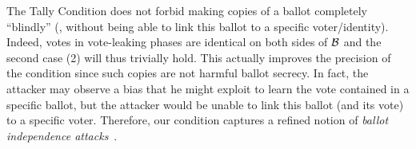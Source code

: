   The Tally Condition does not forbid making
  copies of a ballot completely ``blindly''
  (\ie, without being able to link this ballot to a specific
  voter\slash identity).
  Indeed, votes in vote-leaking phases are identical
  on both sides of $\mathcal{B}$ and the second case (2) will
  thus trivially hold.
  This actually improves the precision of the condition since
  such copies are not harmful \wrt
  ballot secrecy.  In fact,
	 the attacker may observe a bias that he might exploit
  to learn the vote contained in a specific ballot, but the attacker would be
  unable to link this ballot (and its vote) to a specific voter.
Therefore, our condition captures a refined notion of
{\em ballot independence attacks}~\cite{cortier2013attacking}.





